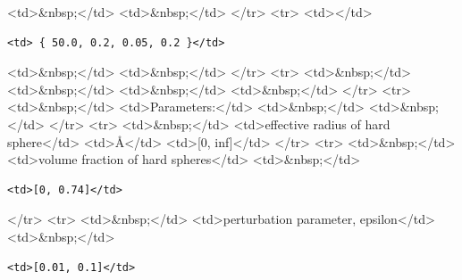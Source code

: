 \textless{}td\textgreater{}\&nbsp;\textless{}/td\textgreater{} \textless{}td\textgreater{}\&nbsp;\textless{}/td\textgreater{} \textless{}/tr\textgreater{} \textless{}tr\textgreater{} \textless{}td\textgreater{}\textless{}/td\textgreater{}

\begin{verbatim}
<td> { 50.0, 0.2, 0.05, 0.2 }</td>
\end{verbatim}

\textless{}td\textgreater{}\&nbsp;\textless{}/td\textgreater{} \textless{}td\textgreater{}\&nbsp;\textless{}/td\textgreater{} \textless{}/tr\textgreater{} \textless{}tr\textgreater{} \textless{}td\textgreater{}\&nbsp;\textless{}/td\textgreater{} \textless{}td\textgreater{}\&nbsp;\textless{}/td\textgreater{} \textless{}td\textgreater{}\&nbsp;\textless{}/td\textgreater{} \textless{}td\textgreater{}\&nbsp;\textless{}/td\textgreater{} \textless{}/tr\textgreater{} \textless{}tr\textgreater{} \textless{}td\textgreater{}\&nbsp;\textless{}/td\textgreater{} \textless{}td\textgreater{}Parameters:\textless{}/td\textgreater{} \textless{}td\textgreater{}\&nbsp;\textless{}/td\textgreater{} \textless{}td\textgreater{}\&nbsp;\textless{}/td\textgreater{} \textless{}/tr\textgreater{} \textless{}tr\textgreater{} \textless{}td\textgreater{}\&nbsp;\textless{}/td\textgreater{} \textless{}td\textgreater{}effective radius of hard sphere\textless{}/td\textgreater{} \textless{}td\textgreater{}\AA{}\textless{}/td\textgreater{} \textless{}td\textgreater{}[0, inf]\textless{}/td\textgreater{} \textless{}/tr\textgreater{} \textless{}tr\textgreater{} \textless{}td\textgreater{}\&nbsp;\textless{}/td\textgreater{} \textless{}td\textgreater{}volume fraction of hard spheres\textless{}/td\textgreater{} \textless{}td\textgreater{}\&nbsp;\textless{}/td\textgreater{}

\begin{verbatim}
<td>[0, 0.74]</td>
\end{verbatim}

\textless{}/tr\textgreater{} \textless{}tr\textgreater{} \textless{}td\textgreater{}\&nbsp;\textless{}/td\textgreater{} \textless{}td\textgreater{}perturbation parameter, epsilon\textless{}/td\textgreater{} \textless{}td\textgreater{}\&nbsp;\textless{}/td\textgreater{}

\begin{verbatim}
<td>[0.01, 0.1]</td>
\end{verbatim}

